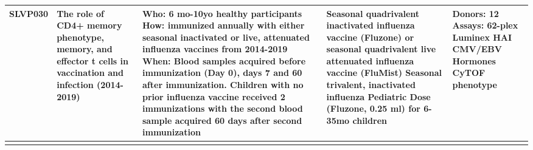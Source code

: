 \documentclass[border=5mm]{standalone}
\begin{document}
\begin{tabularx}{280mm}{p{2cm}p{3cm}XXX}
SLVP030 & The role of CD4+ memory phenotype, memory, and effector t cells in vaccination and infection  (2014-2019) & Who: 6 mo-10yo healthy participants  How: immunized annually with either seasonal inactivated or live, attenuated influenza vaccines from 2014-2019  When: Blood samples acquired before immunization (Day 0), days 7 and 60 after immunization. Children with no prior influenza vaccine received 2 immunizations with the second blood sample acquired 60 days after second immunization & Seasonal quadrivalent inactivated influenza vaccine (Fluzone) or seasonal quadrivalent live attenuated influenza vaccine (FluMist)  Seasonal trivalent, inactivated influenza Pediatric Dose (Fluzone, 0.25 ml) for 6-35mo children & Donors: 12  Assays:  62-plex Luminex  HAI  CMV/EBV  Hormones  CyTOF phenotype\\
\bottomrule{}
\end{tabularx}
\end{document}
